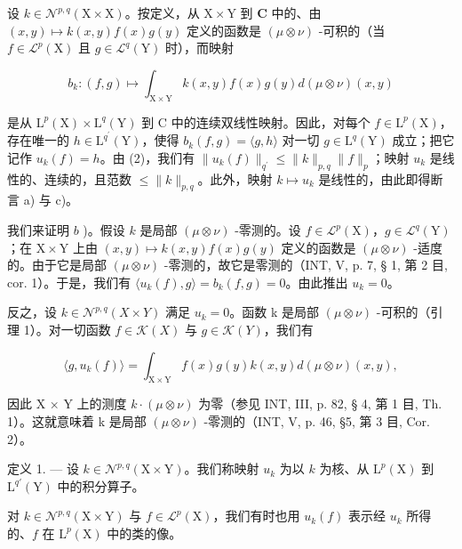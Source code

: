 设 \(k \in \mathcal{N}^{p,q}(\mathrm{X} \times \mathrm{X})\)。按定义，从 \(\mathrm{X} \times \mathrm{Y}\) 到 \(\mathbf{C}\) 中的、由 \((x,y) \mapsto k(x,y)f(x)g(y)\) 定义的函数是 \((\mu \otimes \nu)\) -可积的（当 \(f \in \mathcal{L}^p(\mathrm{X})\) 且 \(g \in \mathcal{L}^q(\mathrm{Y})\) 时），而映射

\[
b _ {k} \colon (f, g) \mapsto \int_ {\mathrm{X} \times \mathrm{Y}} k (x, y) f (x) g (y) d (\mu \otimes \nu) (x, y)
\]

是从 \(\mathrm{L}^{p}(\mathrm{X})\times\mathrm{L}^{q}(\mathrm{Y})\) 到 C 中的连续双线性映射。因此，对每个 \(f\in\mathrm{L}^{p}(\mathrm{X})\)，存在唯一的 \(h\in\mathrm{L}^{q^{\prime}}(\mathrm{Y})\)，使得 \(b_{k}(f,g)=\langle g,h\rangle\) 对一切 \(g\in\mathrm{L}^{q}(\mathrm{Y})\) 成立；把它记作 \(u_{k}(f)=h\)。由 (2)，我们有 \(\|u_{k}(f)\|_{q^{\prime}}\leqslant\|k\|_{p,q}\|f\|_{p}\)；映射 \(u_{k}\) 是线性的、连续的，且范数 \(\leqslant\|k\|_{p,q}\)。此外，映射 \(k\mapsto u_{k}\) 是线性的，由此即得断言 a) 与 c)。

我们来证明 \(b\) )。假设 \(k\) 是局部 \((\mu \otimes \nu)\) -零测的。设 \(f \in \mathcal{L}^p(\mathrm{X})\)，\(g \in \mathcal{L}^q(\mathrm{Y})\)；在 \(\mathrm{X} \times \mathrm{Y}\) 上由 \((x, y) \mapsto k(x, y)f(x)g(y)\) 定义的函数是 \((\mu \otimes \nu)\) -适度的。由于它是局部 \((\mu \otimes \nu)\) -零测的，故它是零测的（INT, V, p. 7, § 1, 第 2 目, cor. 1）。于是，我们有 \(\langle u_k(f), g \rangle = b_k(f, g) = 0\)。由此推出 \(u_k = 0\)。

反之，设 \(k \in \mathcal{N}^{p,q}(X \times Y)\) 满足 \(u_k = 0\)。函数 k 是局部 \((\mu \otimes \nu)\) -可积的（引理 1）。对一切函数 \(f \in \mathcal{K}(X)\) 与 \(g \in \mathcal{K}(Y)\)，我们有

\[
\langle g, u _ {k} (f) \rangle = \int_ {\mathrm{X} \times \mathrm{Y}} f (x) g (y) k (x, y) d (\mu \otimes \nu) (x, y),
\]

因此 X × Y 上的测度 \(k \cdot (\mu \otimes \nu)\) 为零（参见 INT, III, p. 82, § 4, 第 1 目, Th. 1）。这就意味着 k 是局部 \((\mu \otimes \nu)\) -零测的（INT, V, p. 46, §5, 第 3 目, Cor. 2）。

定义 1. --- 设 \(k \in \mathcal{N}^{p,q}(\mathrm{X} \times \mathrm{Y})\)。我们称映射 \(u_k\) 为以 \(k\) 为核、从 \(\mathrm{L}^p(\mathrm{X})\) 到 \(\mathrm{L}^{q'}(\mathrm{Y})\) 中的积分算子。

对 \(k \in \mathcal{N}^{p,q}(\mathrm{X} \times \mathrm{Y})\) 与 \(f \in \mathcal{L}^p(\mathrm{X})\)，我们有时也用 \(u_k(f)\) 表示经 \(u_k\) 所得的、\(f\) 在 \(\mathrm{L}^p(\mathrm{X})\) 中的类的像。

